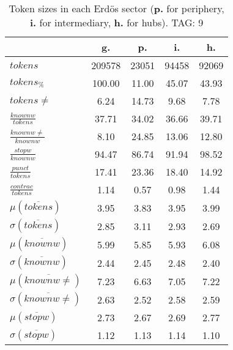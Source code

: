 \begin{table}[h!]
\begin{center}
\begin{tabular}{| l || c | c | c | c |}\hline
 & {\bf g.} & {\bf p.} & {\bf i.} & {\bf h.} \\\hline\hline
$tokens$ & 209578  & 23051  & 94458  & 92069 \\
$tokens_{\%}$ & 100.00  & 11.00  & 45.07  & 43.93 \\
$tokens \neq$ & 6.24  & 14.73  & 9.68  & 7.78 \\\hline
$\frac{knownw}{tokens}$ & 37.71  & 34.02  & 36.66  & 39.71 \\
$\frac{knownw \neq}{knownw}$ & 8.10  & 24.85  & 13.06  & 12.80 \\\hline
$\frac{stopw}{knownw}$ & 94.47  & 86.74  & 91.94  & 98.52 \\
$\frac{punct}{tokens}$ & 17.41  & 23.36  & 18.40  & 14.92 \\
$\frac{contrac}{tokens}$ & 1.14  & 0.57  & 0.98  & 1.44 \\\hline\hline
$\mu(\overline{tokens})$ & 3.95  & 3.83  & 3.95  & 3.99 \\
$\sigma(\overline{tokens})$ & 2.85  & 3.11  & 2.93  & 2.69 \\\hline
$\mu(\overline{knownw})$ & 5.99  & 5.85  & 5.93  & 6.08 \\
$\sigma(\overline{knownw})$ & 2.44  & 2.45  & 2.48  & 2.40 \\\hline
$\mu(\overline{knownw \neq})$ & 7.23  & 6.63  & 7.05  & 7.22 \\
$\sigma(\overline{knownw \neq})$ & 2.63  & 2.52  & 2.58  & 2.59 \\\hline
$\mu(\overline{stopw})$ & 2.73  & 2.67  & 2.69  & 2.77 \\
$\sigma(\overline{stopw})$ & 1.12  & 1.13  & 1.14  & 1.10 \\\hline
\end{tabular}
\caption{Token sizes in each Erd\"os sector ({{\bf p.}} for periphery, {{\bf i.}} for intermediary, {{\bf h.}} for hubs). TAG: 9}
\end{center}
\end{table}